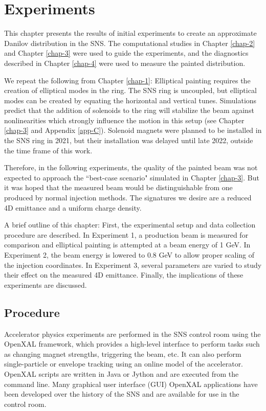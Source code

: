 \chapter{Experiments} \label{chap-5}

This chapter presents the results of initial experiments to create an approximate Danilov distribution in the SNS. The computational studies in Chapter \ref{chap-2} and Chapter \ref{chap-3} were used to guide the experiments, and the diagnostics described in Chapter \ref{chap-4} were used to measure the painted distribution.

We repeat the following from Chapter \ref{chap-1}: Elliptical painting requires the creation of elliptical modes in the ring. The SNS ring is uncoupled, but elliptical modes can be created by equating the horizontal and vertical tunes. Simulations predict that the addition of solenoids to the ring will stabilize the beam against nonlinearities which strongly influence the motion in this setup (see Chapter \ref{chap-3} and Appendix \ref{app-C}). Solenoid magnets were planned to be installed in the SNS ring in 2021, but their installation was delayed until late 2022, outside the time frame of this work. 

Therefore, in the following experiments, the quality of the painted beam was not expected to approach the ``best-case scenario" simulated in Chapter \ref{chap-3}. But it was hoped that the measured beam would be distinguishable from one produced by normal injection methods. The signatures we desire are a reduced 4D emittance and a uniform charge density.

A brief outline of this chapter: First, the experimental setup and data collection procedure are described. In Experiment 1, a production beam is measured for comparison and elliptical painting is attempted at a beam energy of 1 GeV. In Experiment 2, the beam energy is lowered to 0.8 GeV to allow proper scaling of the injection coordinates. In Experiment 3, several parameters are varied to study their effect on the measured 4D emittance. Finally, the implications of these experiments are discussed.


\section{Procedure}

Accelerator physics experiments are performed in the SNS control room using the OpenXAL framework, which provides a high-level interface to perform tasks such as changing magnet strengths, triggering the beam, etc. It can also perform single-particle or envelope tracking using an online model of the accelerator. OpenXAL scripts are written in Java or Jython and are executed from the command line. Many graphical user interface (GUI) OpenXAL applications have been developed over the history of the SNS and are available for use in the control room. 

